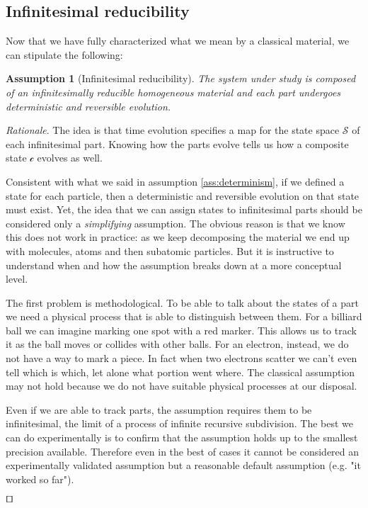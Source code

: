 \documentclass[smallextended]{svjour3}
\numberwithin{equation}{section}
\newenvironment{rationale}{\emph{Rationale}.}{\hfill\(\qed\)}
\newtheorem{assump}{Assumption}
\theoremstyle{definition}
\newenvironment{rationale}{\emph{Rationale}.}{\qed}
\begin{document}
\subsection{Infinitesimal reducibility}

Now that we have fully characterized what we mean by a classical material, we can stipulate the following:

\begin{assump}[Infinitesimal reducibility]\label{ass:infinitesimal_reducibility}
	The system under study is composed of an infinitesimally reducible homogeneous material and each part undergoes deterministic and reversible evolution.
\end{assump}

\begin{rationale}
	The idea is that time evolution specifies a map for the state space $\mathcal{S}$ of each infinitesimal part. Knowing how the parts evolve tells us how a composite state $\mathcal{c}$ evolves as well.
	
	Consistent with what we said in assumption \ref{ass:determinism}, if we defined a state for each particle, then a deterministic and reversible evolution on that state must exist. Yet, the idea that we can assign states to infinitesimal parts should be considered only a \emph{simplifying} assumption. The obvious reason is that we know this does not work in practice: as we keep decomposing the material we end up with molecules, atoms and then subatomic particles. But it is instructive to understand when and how the assumption breaks down at a more conceptual level.
	
	The first problem is methodological. To be able to talk about the states of a part we need a physical process that is able to distinguish between them. For a billiard ball we can imagine marking one spot with a red marker. This allows us to track it as the ball moves or collides with other balls. For an electron, instead, we do not have a way to mark a piece. In fact when two electrons scatter we can't even tell which is which, let alone what portion went where. The classical assumption may not hold because we do not have suitable physical processes at our disposal.
	
    Even if we are able to track parts, the assumption requires them to be infinitesimal, the limit of a process of infinite recursive subdivision. The best we can do experimentally is to confirm that the assumption holds up to the smallest precision available. Therefore even in the best of cases it cannot be considered an experimentally validated assumption but a reasonable default assumption (e.g. "it worked so far").
	

\end{rationale}
\end{document}
